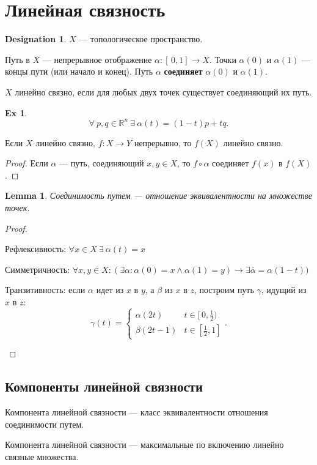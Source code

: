\documentclass[11pt]{book}
\newcommand{\R}{\mathbb{R}}
\theoremstyle{definition}
\theoremstyle{plain}
\theoremstyle{plain}
\newtheorem*{lm}{Lemma}
\theoremstyle{definition}
\newtheorem*{ex}{Ex}
\newtheorem*{name}{Designation}
\theoremstyle{remark}
\begin{document}
\section{Линейная связность}
\begin{name}
    $ X$ --- топологическое пространство.
\end{name}
\begin{defn}
    Путь в $ X$ --- непрерывное отображение  $ \alpha : [\,0, 1] \to  X$. Точки $ \alpha (0)$ и $ \alpha (1)$ --- концы пути (или начало и конец).
    Путь $ \alpha  $ {\bf соединяет} $ \alpha (0)$ и $ \alpha (1)$.
\end{defn}
\begin{defn}
    $ X$ линейно связно, если для любых двух точек существует соединяющий их путь.
\end{defn}
\begin{ex}
    \[
	\forall~ p, q \in  \R^{n} ~ \exists ~ \alpha (t) = (1-t)p + tq
    .\]
\end{ex}
\begin{thm}
    Если $ X$ линейно связно,  $ f: X \to  Y$ непрерывно, то $ f(X)$ линейно связно.
\end{thm}
\begin{proof}
    Если $ \alpha $ ---  путь, соединяющий $ x, y \in  X$, то $ f \circ \alpha $ соединяет $ f(x)$ в $ f(X)$.
\end{proof}
\begin{lm}
    Соединимость путем --- отношение эквивалентности на множестве точек.
\end{lm}
\begin{proof}
    $ $
    \begin{description}
	\item Рефлексивность: $ \forall x \in  X ~ \exists ~ \alpha (t) = x$
	\item Симметричность: $ \forall x, y \in X: (\exists \alpha : \alpha (0) = x \wedge \alpha (1) = y) \to \exists \overline{ \alpha } = \alpha (1-t))$
	\item Транзитивность: если $ \alpha $ идет из $ x$ в $ y$, а  $ \beta $ из $ x$ в  $ z$, построим путь  $ \gamma$, идущий из  $ x$ в $ z$:
	    \[
		\gamma(t) =
		\begin{cases}
		    \alpha (2t) & t \in [\,0,\frac{1}{2}) \\
		    \beta (2t - 1) & t \in  [\frac{1}{2}, 1]
		\end{cases}
	    .\]
    \end{description}
\end{proof}
\subsection{Компоненты линейной связности}
\begin{defn}
    Компонента линейной связности --- класс эквивалентности отношения соединимости путем.
\end{defn}
\begin{defn}[переформулировка]
    Компонента линейной связности --- максимальные по включению линейно связные множества.
\end{defn}
\end{document}
